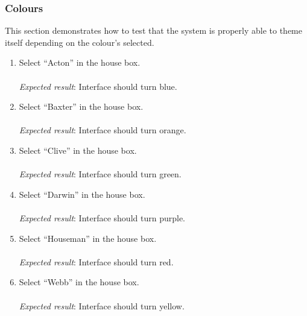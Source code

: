 \subsubsection{Colours} %
\label{ssub:colours}
This section demonstrates how to test that the system is properly able to theme itself depending on the colour's selected.
\begin{enumerate}
\item Select ``Acton'' in the house box.\\\\
\textit{Expected result}: Interface should turn blue.\\
\item Select ``Baxter'' in the house box.\\\\
\textit{Expected result}: Interface should turn orange.\\
\item Select ``Clive'' in the house box.\\\\
\textit{Expected result}: Interface should turn green.\\
\item Select ``Darwin'' in the house box.\\\\
\textit{Expected result}: Interface should turn purple.\\
\item Select ``Houseman'' in the house box.\\\\
\textit{Expected result}: Interface should turn red.\\
\item Select ``Webb'' in the house box.\\\\
\textit{Expected result}: Interface should turn yellow.
\end{enumerate}

